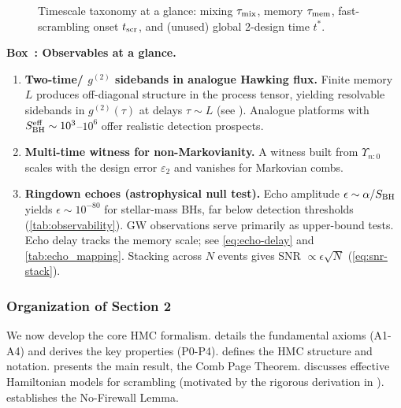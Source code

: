 \documentclass[11pt,a4paper]{article}
\newcommand{\gII}{g^{(2)}}
\newcommand{\HMC}{\textsc{HMC}\xspace}
\newcounter{boxedresult}
\newenvironment{boxedresult}[1]{\refstepcounter{boxedresult}\begin{infobox}\noindent\textbf{Box~\theboxedresult: #1.}}{\end{infobox}}
\theoremstyle{plain}
\theoremstyle{definition}
\theoremstyle{remark}
\begin{document}
\begin{figure}[t]
  \centering
  \vspace{-1ex}
  \caption{Timescale taxonomy at a glance: mixing $\tau_{\rm mix}$, memory $\tau_{\rm mem}$,
  fast-scrambling onset $t_{\rm scr}$, and (unused) global 2-design time $t^*$.}
  \label{fig:timeline}
\end{figure}

\begin{boxedresult}{Observables at a glance}
\begin{enumerate}[leftmargin=*]
\item \textbf{Two-time/ \(\gII\) sidebands in analogue Hawking flux.} Finite memory \(L\) produces off-diagonal structure in the process tensor, yielding resolvable sidebands in \(\gII(\tau)\) at delays \(\tau\sim L\) (see ). Analogue platforms with $S_{\rm BH}^{\rm eff}\sim 10^3$--$10^6$ offer realistic detection prospects.
\item \textbf{Multi-time witness for non-Markovianity.} A witness built from \(\Upsilon_{n{:}0}\) scales with the design error \(\varepsilon_2\) and vanishes for Markovian combs.
\item \textbf{Ringdown echoes (astrophysical null test).} Echo amplitude $\epsilon\sim \alpha/S_{\rm BH}$ yields $\epsilon\sim 10^{-80}$ for stellar-mass BHs, far below detection thresholds (\cref{tab:observability}). GW observations serve primarily as upper-bound tests. Echo delay tracks the memory scale; see \eqref{eq:echo-delay} and \cref{tab:echo_mapping}. Stacking across \(N\) events gives SNR \(\propto \epsilon \sqrt{N}\) (\eqref{eq:snr-stack}).
\end{enumerate}
\end{boxedresult}

\subsubsection{Organization of Section 2}
We now develop the core \HMC{} formalism.
 details the fundamental axioms (A1-A4) and derives the key properties (P0-P4).
 defines the \HMC{} structure and notation.
 presents the main result, the Comb Page Theorem.
 discusses effective Hamiltonian models for scrambling (motivated by the rigorous derivation in ).
 establishes the No-Firewall Lemma.
\end{document}
